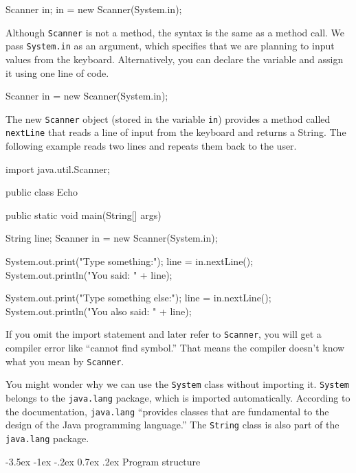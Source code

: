 \documentclass[12pt]{book}
\makeatletter
\theoremstyle{exercise}
\newcommand{\java}[1]{\verb"#1"}
\renewcommand{\section}{\@startsection {section}{1}{\z@}%
    {-3.5ex \@plus -1ex \@minus -.2ex}%
    {0.7ex \@plus.2ex}%
    {\normalfont\Large\bfseries}}
\newcommand{\java}[1]{\lstinline{#1}} %
\makeatother
\begin{document}
\begin{code}
    Scanner in;
    in = new Scanner(System.in);
\end{code}


Although \java{Scanner} is not a method, the syntax is the same as a method call.
We pass \java{System.in} as an argument, which specifies that we are planning to input values from the keyboard.
Alternatively, you can declare the variable and assign it using one line of code.

\begin{code}
    Scanner in = new Scanner(System.in);
\end{code}

The new \java{Scanner} object (stored in the variable \java{in}) provides a method called \java{nextLine} that reads a line of input from the keyboard and returns a String.
The following example reads two lines and repeats them back to the user.

\begin{code}
import java.util.Scanner;

public class Echo {
    public static void main(String[] args) {
        String line;
        Scanner in = new Scanner(System.in);

        System.out.print("Type something:");
        line = in.nextLine();
        System.out.println("You said: " + line);

        System.out.print("Type something else:");
        line = in.nextLine();
        System.out.println("You also said: " + line);
    }
}
\end{code}

If you omit the import statement and later refer to \java{Scanner}, you will get a compiler error like ``cannot find symbol.''
That means the compiler doesn't know what you mean by \java{Scanner}.

You might wonder why we can use the \java{System} class without importing it.
\java{System} belongs to the \java{java.lang} package, which is imported automatically.
According to the documentation, \java{java.lang} ``provides classes that are fundamental to the design of the Java programming language.''
The \java{String} class is also part of the \java{java.lang} package.

\section{Program structure}
\label{sec:library}
\end{document}
